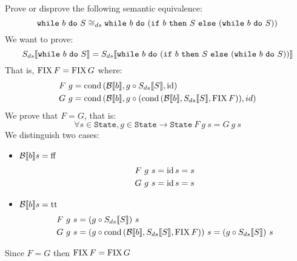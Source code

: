 \begin{exercise}{
    Prove or disprove the following semantic equivalence:
    \[ \wwhile{b}{S} \cong_{ds} \wwhile{b}{(\wif{b}{S}{(\wwhile{b}{S})})} \]
}
    We want to prove:
    \[ \Sds{\wwhile{b}{S}} = \Sds{\wwhile{b}{(\wif{b}{S}{(\wwhile{b}{S})})}} \]
    That is, $\FIX F = \FIX G$ where:
    \begin{align*}
        F\ g &= \cond{\Bool{b}}{g \circ \Sds{S}}{\id} \\
        G\ g &= \cond{\Bool{b}}{g \circ (\cond{\Bool{b}}{\Sds{S}}{\FIX F})}{id}
    \end{align*}
    We prove that $F = G$, that is:
    \[ \forall s \in \texttt{State}, g \in \texttt{State} \to \texttt{State} \ F\ g\ s = G\ g\ s \]
    We distinguish two cases:
    \begin{itemize}
        \item $\Bool{b} s = \text{ff}$
            \begin{align*}
                F\ g \ s = \id s = s \\
                G\ g \ s = \id s = s
            \end{align*}
        \item $\Bool{b} s = \text{tt}$
            \begin{align*}
                F\ g\ s &= (g \circ \Sds{S})\ s \\
                G\ g\ s &= (g \circ \cond{\Bool{b}}{\Sds{S}}{\FIX F})\ s = (g \circ \Sds{S})\ s
            \end{align*}
    \end{itemize}
    Since $F = G$ then $\FIX F = \FIX G$
\end{exercise}
